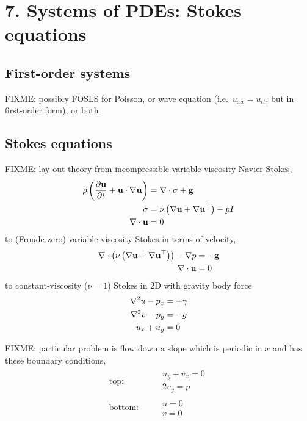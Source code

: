 \chapter{7. Systems of PDEs: Stokes equations}

\section{First-order systems}

FIXME: possibly FOSLS for Poisson, or wave equation (i.e.~$u_{xx}=u_{tt}$, but in first-order form), or both

\section{Stokes equations}

FIXME: lay out theory from incompressible variable-viscosity Navier-Stokes,
\begin{align*}
\rho \left(\frac{\partial \mathbf{u}}{\partial t} + \mathbf{u} \cdot \nabla \mathbf{u}\right) &= \nabla\cdot \sigma + \mathbf{g} \\
\sigma &= \nu \left(\nabla \mathbf{u} + \nabla \mathbf{u}^{\top}\right) - p I \\
\nabla\cdot \mathbf{u} &= 0
\end{align*}
to (Froude zero) variable-viscosity Stokes in terms of velocity,
\begin{align*}
\nabla\cdot \left(\nu \left(\nabla \mathbf{u} + \nabla \mathbf{u}^{\top}\right)\right) - \nabla p &= - \mathbf{g} \\
\nabla\cdot \mathbf{u} &= 0
\end{align*}
to constant-viscosity ($\nu=1$) Stokes in 2D with gravity body force
\begin{align}
\nabla^2 u - p_x &= + \gamma \label{stokesu} \\
\nabla^2 v - p_y &= - g \label{stokesv} \\
u_x + u_y &= 0 \label{stokesincomp} 
\end{align}

FIXME: particular problem is flow down a slope which is periodic in $x$ and has these boundary conditions,
\begin{align}
\text{top:}&    & &\begin{array}{l} u_y + v_x = 0 \\ 2 v_y = p\end{array} \\
\text{bottom:}& & &\begin{array}{l} u = 0 \\ v = 0 \end{array}
\end{align}

